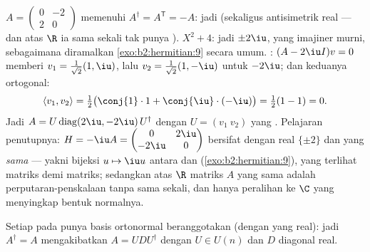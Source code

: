 \begin{example}\label{ex:b2:hermitian:skewexample}
$A = \begin{pmatrix} 0 & -2\\ 2 & 0\end{pmatrix}$ memenuhi
$A^\dagger = A^{\mathsf T} = -A$: jadi  (sekaligus
antisimetrik real --- dan atas $\R$ ia sama sekali tak punya ).
 $X^2 + 4$: jadi  $\pm2\iu$,
yang imajiner murni, sebagaimana diramalkan \cref{exo:b2:hermitian:9} secara
umum. : $(A - 2\iu I)v = 0$ memberi $v_1 =
\frac{1}{\sqrt2}(1, \iu)$, lalu $v_2 = \frac{1}{\sqrt2}(1,
-\iu)$ untuk $-2\iu$; dan keduanya ortogonal:
\[
\langle v_1, v_2\rangle
= \tfrac12\bigl(\conj{1}\cdot1 +
\conj{\iu}\cdot(-\iu)\bigr)
= \tfrac12(1 - 1) = 0 .
\]
Jadi $A = U\operatorname{diag}(2\iu, -2\iu)\,U^\dagger$ dengan $U =
(v_1\ v_2)$ yang . Pelajaran penutupnya: $H = -\iu A =
\begin{pmatrix} 0 & 2\iu\\ -2\iu & 0\end{pmatrix}$ bersifat 
dengan  real $\{\pm2\}$ dan  yang \emph{sama}
--- yakni bijeksi $u \mapsto \iu u$ antara  dan 
(\cref{exo:b2:hermitian:9}), yang terlihat matriks demi matriks; sedangkan atas $\R$
matriks $A$ yang sama adalah perputaran-penskalaan tanpa  sama
sekali, dan hanya peralihan ke $\C$ yang menyingkap bentuk normalnya.
\end{example}

\begin{theorem}\label{thm:b2:hermitian:spectral}
Setiap  pada  punya basis ortonormal
beranggotakan  (dengan  yang real): jadi $A^\dagger = A$
mengakibatkan $A = U D U^{\dagger}$ dengan $U \in U(n)$ dan $D$
diagonal real.
\end{theorem}

